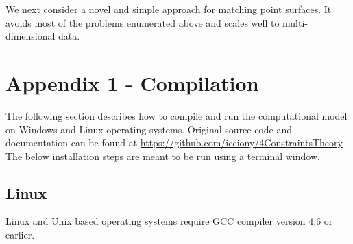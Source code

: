 \documentclass[11]{article}
\begin{document}
We next consider a novel and simple approach for matching point surfaces. It avoids most of the problems enumerated above and scales well to multi-dimensional data.  



\section{Appendix 1 - Compilation}
The following section describes how to compile and run the computational model on Windows and Linux operating systems. 
Original source-code and documentation can be found at \url{https://github.com/iceiony/4ConstraintsTheory}
The below installation steps are meant to be run using a terminal window.

\subsection{Linux}
Linux and Unix based operating systems require GCC compiler version 4.6 or earlier. 
\end{document}
